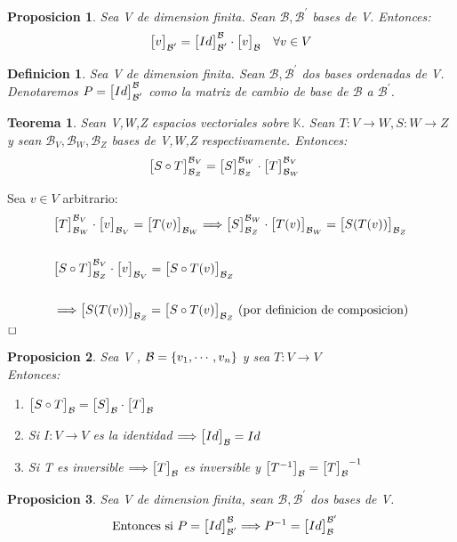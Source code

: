 \documentclass[]{article}
\newtheorem{theorem}{Teorema}
\newtheorem{proposition}{Proposicion}[theorem]
\newtheorem{definition}{Definicion}
\newenvironment{proof}{\noindent{\bf Prueba:}}{$\hfill \Box$ \vspace{10pt}}
\newcommand{\K}{
    \mathbb{K}
}
\newcommand{\ida}{\Longrightarrow}
\newcommand{\base}{\text{$\mathcal{B}$}}
\newcommand{\basep}{\text{$\mathcal{B}^{\prime}$}}
\begin{document}
\begin{proposition}
    Sea V \espvec de dimension finita. Sean $\base,\basep$ bases de V. Entonces:
    \begin{align*}
        \cbs{v}{\basep}{}=\cbs{Id}{\basep}{\base} \cdot \cbs{v}{\base}{} \quad \forall v \in V
    \end{align*}
\end{proposition}

\begin{definition}
    Sea V \espvec de dimension finita. Sean $\base,\basep$ dos bases ordenadas de V.
    Denotaremos $P=\cbs{Id}{\basep}{\base}$ como la matriz de cambio de base de $\base$ a $\basep$. 
\end{definition}

\begin{theorem}
    Sean V,W,Z espacios vectoriales sobre $\K$. Sean $T:V\rightarrow W, S:W\rightarrow Z$ \tl y sean
    $\base_V,\base_W,\base_Z$ bases de V,W,Z respectivamente. Entonces:
    \begin{align*}
        &\cbs{S \circ T}{\base_Z}{\base_V}=\cbs{S}{\base_Z}{\base_W} \cdot \cbs{T}{\base_W}{\base_V} 
    \end{align*}
\end{theorem}
\begin{proof}
    Sea $v \in V$ arbitrario:
    \begin{align*}
        &\cbs{T}{\base_W}{\base_V} \cdot \cbs{v}{\base_V}{} = \cbs{\T{v}}{\base_W}{}
        \ida \cbs{S}{\base_Z}{\base_W} \cdot \cbs{\T{v}}{\base_W}{} = \cbs{S(\T{v})}{\base_Z}{}\\\\
        &\cbs{S \circ T}{\base_Z}{\base_V} \cdot  \cbs{v}{\base_V}{} = \cbs{S \circ \T{v}}{\base_Z}{}\\\\
        &\ida \cbs{S(\T{v})}{\base_Z}{} = \cbs{S \circ \T{v}}{\base_Z}{} \text{ (por definicion de composicion)}
    \end{align*}
\end{proof}
\newpage
\begin{proposition}
    Sea V \espvec , $\base = \conjunto{v_1,\cdots,v_n}$ y sea $T:V\rightarrow V$ \tl\\
    Entonces:
    \begin{enumerate}
        \item $\cbs{S\circ T}{\base}{}=\cbs{S}{\base}{} \cdot \cbs{T}{\base}{}$
        \item Si $I:V\rightarrow V$ es la identidad $\ida \cbs{Id}{\base}{}=Id$
        \item Si T es inversible $\ida \cbs{T}{\base}{}$ es inversible y
        $\cbs{T^{-1}}{\base}{}=\cbs{T}{\base}{}^{-1}$
    \end{enumerate}
\end{proposition}
\begin{proposition}
    Sea V \espvec de dimension finita, sean $\base,\basep$ dos bases de V.
    \begin{align*}
        &\text{Entonces si } P=\cbs{Id}{\basep}{\base} \ida P^{-1}=\cbs{Id}{\base}{\basep}
    \end{align*}
\end{proposition}
\end{document}

